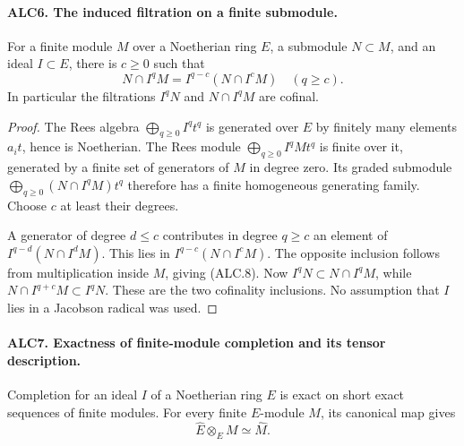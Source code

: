 \documentclass[11pt,a4paper]{article}
\numberwithin{equation}{section}
\theoremstyle{remark}\newtheorem{remark}[theorem]{Remark}
\begin{document}
\paragraph{ALC6. The induced filtration on a finite submodule.}
\label{claim:ALC6}
For a finite module \(M\) over a Noetherian ring \(E\), a
submodule \(N\subset M\), and an ideal \(I\subset E\),
there is \(c\ge0\) such that
\[
 N\cap I^qM=I^{q-c}(N\cap I^cM)\quad(q\ge c).
                                                        \tag{ALC.8}
\]
In particular the filtrations \(I^qN\) and \(N\cap I^qM\)
are cofinal.

\begin{proof}
The Rees algebra \(\bigoplus_{q\ge0}I^qt^q\) is generated
over \(E\) by finitely many elements \(a_it\), hence is
Noetherian.  The Rees module \(\bigoplus_{q\ge0}I^qMt^q\)
is finite over it, generated by a finite set of generators of
\(M\) in degree zero.  Its graded submodule
\(\bigoplus_{q\ge0}(N\cap I^qM)t^q\) therefore has a
finite homogeneous generating family.  Choose \(c\) at
least their degrees.

A generator of degree \(d\le c\) contributes in degree
\(q\ge c\) an element of
\(I^{q-d}(N\cap I^dM)\).  This lies in
\(I^{q-c}(N\cap I^cM)\).  The opposite inclusion follows
from multiplication inside \(M\), giving (ALC.8).
Now \(I^qN\subset N\cap I^qM\), while
\(N\cap I^{q+c}M\subset I^qN\).  These are the two
cofinality inclusions.  No assumption that \(I\) lies in a
Jacobson radical was used.
\end{proof}

\paragraph{ALC7. Exactness of finite-module completion and its tensor description.}
\label{claim:ALC7}
Completion for an ideal \(I\) of a Noetherian ring \(E\)
is exact on short exact sequences of finite modules.  For
every finite \(E\)-module \(M\), its canonical map gives
\[
               \widehat E\otimes_E M\simeq\widehat M.
                                                        \tag{ALC.9}
\]
\end{document}
